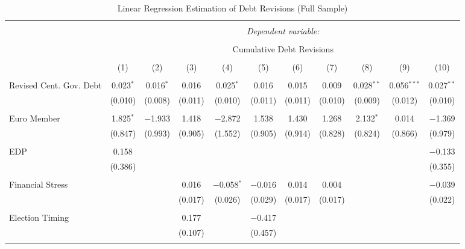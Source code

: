 \begin{table}[!htbp] \centering 
  \caption{Linear Regression Estimation of Debt Revisions (Full Sample)} 
  \label{debt_results} 
\tiny 
\begin{tabular}{@{\extracolsep{5pt}}lcccccccccc} 
\\[-1.8ex]\hline 
\hline \\[-1.8ex] 
 & \multicolumn{10}{c}{\textit{Dependent variable:}} \\ 
\cline{2-11} 
\\[-1.8ex] & \multicolumn{10}{c}{Cumulative Debt Revisions} \\ 
\\[-1.8ex] & (1) & (2) & (3) & (4) & (5) & (6) & (7) & (8) & (9) & (10)\\ 
\hline \\[-1.8ex] 
 Revised Cent. Gov. Debt & 0.023$^{*}$ & 0.016$^{*}$ & 0.016 & 0.025$^{*}$ & 0.016 & 0.015 & 0.009 & 0.028$^{**}$ & 0.056$^{***}$ & 0.027$^{**}$ \\ 
  & (0.010) & (0.008) & (0.011) & (0.010) & (0.011) & (0.011) & (0.010) & (0.009) & (0.012) & (0.010) \\ 
  & & & & & & & & & & \\ 
 Euro Member & 1.825$^{*}$ & $-$1.933 & 1.418 & $-$2.872 & 1.538 & 1.430 & 1.268 & 2.132$^{*}$ & 0.014 & $-$1.369 \\ 
  & (0.847) & (0.993) & (0.905) & (1.552) & (0.905) & (0.914) & (0.828) & (0.824) & (0.866) & (0.979) \\ 
  & & & & & & & & & & \\ 
 EDP & 0.158 &  &  &  &  &  &  &  &  & $-$0.133 \\ 
  & (0.386) &  &  &  &  &  &  &  &  & (0.355) \\ 
  & & & & & & & & & & \\ 
 Financial Stress &  &  & 0.016 & $-$0.058$^{*}$ & $-$0.016 & 0.014 & 0.004 &  &  & $-$0.039 \\ 
  &  &  & (0.017) & (0.026) & (0.029) & (0.017) & (0.017) &  &  & (0.022) \\ 
  & & & & & & & & & & \\ 
 Election Timing &  &  & 0.177 &  & $-$0.417 &  &  &  &  &  \\ 
  &  &  & (0.107) &  & (0.457) &  &  &  &  &  \\ 
  & & & & & & & & & & \\ 

\end{tabular}
\end{table}
